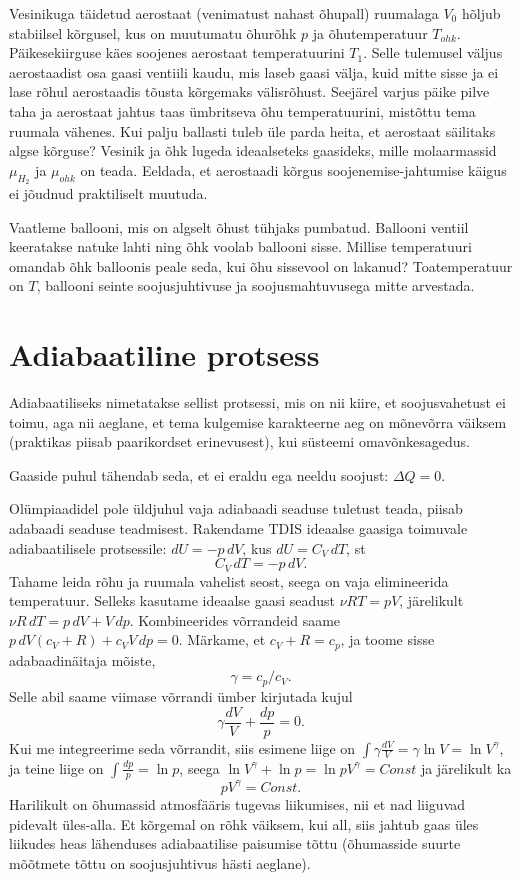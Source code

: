 \documentclass[a4paper,11pt,twocolumn]{article}
\begin{document}
\begin{question}[Lõppv 2006, G6]
	Vesinikuga täidetud aerostaat (venimatust nahast õhupall) ruumalaga \( V_0 \) hõljub stabiilsel kõrgusel, kus on muutumatu õhurõhk \( p \) ja õhutemperatuur \( T_{ohk} \). Päikesekiirguse käes soojenes aerostaat temperatuurini \( T_1 \). Selle tulemusel väljus aerostaadist osa gaasi ventiili kaudu, mis laseb gaasi välja, kuid mitte sisse ja ei lase rõhul aerostaadis tõusta kõrgemaks välisrõhust. Seejärel varjus päike pilve taha ja aerostaat jahtus taas ümbritseva õhu temperatuurini, mistõttu tema ruumala vähenes. Kui palju ballasti tuleb üle parda heita, et aerostaat säilitaks algse kõrguse? Vesinik ja õhk lugeda ideaalseteks gaasideks, mille molaarmassid \( \mu _{H_{2}} \) ja \( \mu_{ohk} \) on teada. Eeldada, et aerostaadi kõrgus soojenemise-jahtumise käigus ei jõudnud praktiliselt muutuda.
\end{question}
\begin{question}
	Vaatleme ballooni, mis on algselt õhust tühjaks pumbatud. Ballooni ventiil keeratakse natuke lahti ning õhk voolab ballooni sisse. Millise temperatuuri omandab õhk balloonis peale seda, kui õhu sissevool on lakanud? Toatemperatuur on \( T \), ballooni seinte soojusjuhtivuse ja soojusmahtuvusega mitte arvestada.
\end{question}

\section{Adiabaatiline protsess}
Adiabaatiliseks nimetatakse sellist protsessi, mis on
nii kiire, et soojusvahetust ei toimu, aga nii aeglane, et tema kulgemise karakteerne aeg on mõnevõrra väiksem (praktikas piisab paarikordset erinevusest), kui süsteemi omavõnkesagedus.

Gaaside puhul tähendab seda, et ei eraldu ega neeldu soojust: \( \Delta Q=0 \).

Olümpiaadidel pole üldjuhul vaja adiabaadi seaduse tuletust teada, piisab adabaadi seaduse teadmisest. Rakendame TDIS ideaalse gaasiga toimuvale adiabaatilisele protsessile: \( dU=-p\, dV \), kus \( dU=C_V \, dT \), st \[ C_V  \, dT=-p\, dV .\]
Tahame leida rõhu ja ruumala vahelist seost, seega on vaja elimineerida temperatuur. Selleks kasutame ideaalse gaasi seadust \( \nu RT=pV \), järelikult \( \nu R\,dT=p\, dV+V\, dp. \) Kombineerides võrrandeid saame \( p\,dV(c_V+R)+c_V V\, dp=0. \) Märkame, et \( c_V+R=c_p \), ja toome sisse adabaadinäitaja mõiste,
\[ \gamma=c_p/c_V. \]
Selle abil saame viimase võrrandi ümber kirjutada kujul
\[ \gamma \frac{dV}{V}+\frac{dp}{p}=0. \]
Kui me integreerime seda võrrandit, siis esimene liige on \( \int \gamma \frac{dV}{V}=\gamma \ln V=\ln V^\gamma \), ja teine liige on \( \int \frac{dp}{p}=\ln p \), seega \( \ln V^\gamma +\ln p=\ln pV^\gamma=Const \) ja järelikult ka
\[ pV^\gamma=Const. \]
Harilikult on õhumassid atmosfääris tugevas liikumises, nii et nad liiguvad pidevalt üles-alla. Et kõrgemal on rõhk väiksem, kui all, siis jahtub gaas üles liikudes heas lähenduses adiabaatilise paisumise tõttu (õhumasside suurte mõõtmete tõttu on
soojusjuhtivus hästi aeglane).
\end{document}
